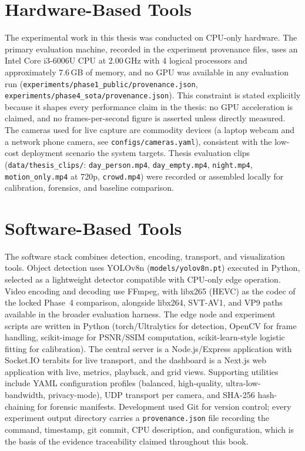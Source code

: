 \section{Hardware-Based Tools}

The experimental work in this thesis was conducted on CPU-only hardware. The primary evaluation machine, recorded in the experiment provenance files, uses an Intel Core i3-6006U CPU at 2.00\,GHz with 4 logical processors and approximately 7.6\,GB of memory, and no GPU was available in any evaluation run (\texttt{experiments/phase1\_public/provenance.json}, \texttt{experiments/phase4\_sota/provenance.json}). This constraint is stated explicitly because it shapes every performance claim in the thesis: no GPU acceleration is claimed, and no frames-per-second figure is asserted unless directly measured. The cameras used for live capture are commodity devices (a laptop webcam and a network phone camera, see \texttt{configs/cameras.yaml}), consistent with the low-cost deployment scenario the system targets. Thesis evaluation clips (\texttt{data/thesis\_clips/}: \texttt{day\_person.mp4}, \texttt{day\_empty.mp4}, \texttt{night.mp4}, \texttt{motion\_only.mp4} at 720p, \texttt{crowd.mp4}) were recorded or assembled locally for calibration, forensics, and baseline comparison.

\section{Software-Based Tools}

The software stack combines detection, encoding, transport, and visualization tools. Object detection uses YOLOv8n (\texttt{models/yolov8n.pt}) executed in Python, selected as a lightweight detector compatible with CPU-only edge operation. Video encoding and decoding use FFmpeg, with libx265 (HEVC) as the codec of the locked Phase~4 comparison, alongside libx264, SVT-AV1, and VP9 paths available in the broader evaluation harness. The edge node and experiment scripts are written in Python (torch/Ultralytics for detection, OpenCV for frame handling, scikit-image for PSNR/SSIM computation, scikit-learn-style logistic fitting for calibration). The central server is a Node.js/Express application with Socket.IO terabits for live transport, and the dashboard is a Next.js web application with live, metrics, playback, and grid views. Supporting utilities include YAML configuration profiles (balanced, high-quality, ultra-low-bandwidth, privacy-mode), UDP transport per camera, and SHA-256 hash-chaining for forensic manifests. Development used Git for version control; every experiment output directory carries a \texttt{provenance.json} file recording the command, timestamp, git commit, CPU description, and configuration, which is the basis of the evidence traceability claimed throughout this book.

